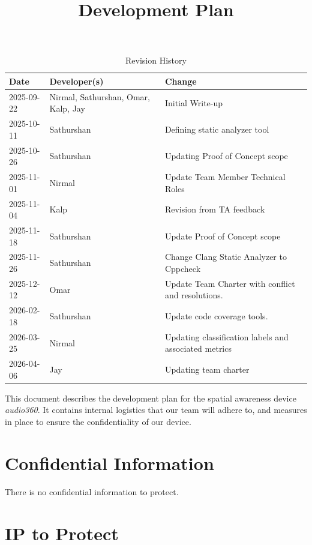\documentclass{article}
\title{Development Plan\\\progname}
\author{\authname}
\date{}
\begin{document}
\maketitle

\newpage{}


\begin{table}[hp]
\caption{Revision History} \label{TblRevisionHistory}
\begin{tabularx}{\textwidth}{llX}
\toprule
\textbf{Date} & \textbf{Developer(s)} & \textbf{Change}\\
\midrule
2025-09-22 & Nirmal, Sathurshan, Omar, Kalp, Jay & Initial Write-up\\
2025-10-11 & Sathurshan & Defining static analyzer tool\\
2025-10-26 & Sathurshan & Updating Proof of Concept scope\\
2025-11-01 & Nirmal & Update Team Member Technical Roles \\
2025-11-04 & Kalp & Revision from TA feedback\\
2025-11-18 & Sathurshan & Update Proof of Concept scope\\
2025-11-26 & Sathurshan & Change Clang Static Analyzer to Cppcheck\\
2025-12-12 & Omar & Update Team Charter with conflict and resolutions.\\
2026-02-18 & Sathurshan & Update code coverage tools.\\
2026-03-25 & Nirmal & Updating classification labels and associated metrics \\
2026-04-06 & Jay & Updating team charter \\
\bottomrule
\end{tabularx}
\end{table}

\newpage

\tableofcontents

\newpage{}

This document describes the development plan for the spatial awareness device
\textit{audio360}. It contains internal logistics that our team will adhere to,
and measures in place to ensure the confidentiality of our device.

\section{Confidential Information}

There is no confidential information to protect.

\section{IP to Protect}
\end{document}
